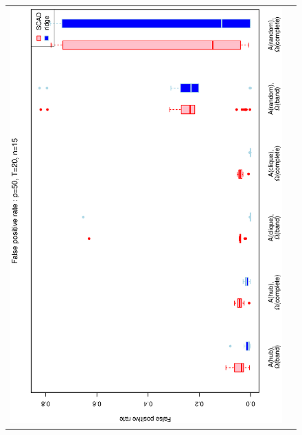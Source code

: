 \begin{figure}[h!]
\centering
\begin{tabular}{cc}
\includegraphics[scale=0.45,angle=270]{ROCfpr50T20N15_25.eps}
\\

\end{tabular}
\end{figure}
